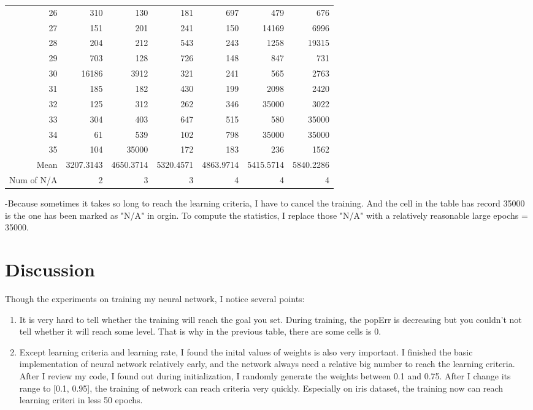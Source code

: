 \documentclass[11pt]{article}
\begin{document}
\begin{center}
\begin{tabular}{rrrrrrr}
26 & 310 & 130 & 181 & 697 & 479 & 676\\
27 & 151 & 201 & 241 & 150 & 14169 & 6996\\
28 & 204 & 212 & 543 & 243 & 1258 & 19315\\
29 & 703 & 128 & 726 & 148 & 847 & 731\\
30 & 16186 & 3912 & 321 & 241 & 565 & 2763\\
31 & 185 & 182 & 430 & 199 & 2098 & 2420\\
32 & 125 & 312 & 262 & 346 & 35000 & 3022\\
33 & 304 & 403 & 647 & 515 & 580 & 35000\\
34 & 61 & 539 & 102 & 798 & 35000 & 35000\\
35 & 104 & 35000 & 172 & 183 & 236 & 1562\\
Mean & 3207.3143 & 4650.3714 & 5320.4571 & 4863.9714 & 5415.5714 & 5840.2286\\
Num of N/A & 2 & 3 & 3 & 4 & 4 & 4\\
\end{tabular}
\end{center}

-Because sometimes it takes so long to reach the learning criteria, I have to cancel the training. And the cell in the table has record 35000 is the one has been marked as "N/A" in orgin. To compute the statistics, I replace those "N/A" with a relatively reasonable large epochs = 35000.

\section{Discussion}
\label{sec-4}
Though the experiments on training my neural network, I notice several points:
\begin{enumerate}
\item It is very hard to tell whether the training will reach the goal you set. During training, the popErr is decreasing but you couldn't not tell whether it will reach some level. That is why in the previous table, there are some cells is 0.
\item Except learning criteria and learning rate, I found the inital values of weights is also very important. I finished the basic implementation of neural network relatively early, and the network always need a relative big number to reach the learning criteria. After I review my code, I found out during initialization, I randomly generate the weights between 0.1 and 0.75. After I change its range to [0.1, 0.95], the training of network can reach criteria very quickly. Especially on iris dataset, the training now can reach learning criteri in less 50 epochs.
\end{enumerate}
\end{document}
